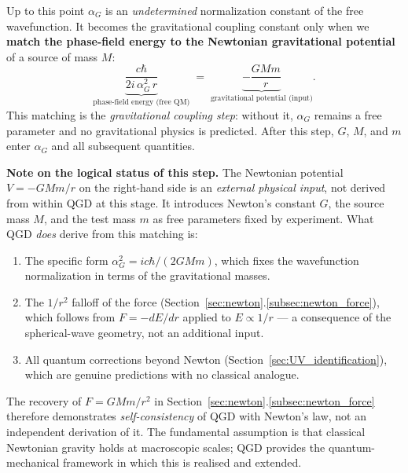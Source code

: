 \documentclass[11pt,a4paper]{article}
\theoremstyle{definition}
\theoremstyle{remark}
\begin{document}
	\begin{tcolorbox}[enhanced,breakable,
	  colback=white,colframe=black,
	  title={\textbf{Key step: this is where the free-Dirac theory couples to gravity}},
	  fonttitle=\bfseries]
	Up to this point $\alpha_G$ is an \emph{undetermined} normalization constant of the
	free wavefunction.  It becomes the gravitational coupling constant only when we
	\textbf{match the phase-field energy to the Newtonian gravitational potential} of a
	source of mass $M$:
	\begin{equation}
	  \underbrace{\frac{c\hbar}{2i\,\alpha_G^2\,r}}_{\text{phase-field energy (free QM)}}
	  \;=\;
	  \underbrace{-\frac{GMm}{r}}_{\text{gravitational potential (input)}}.
	  \label{eq:coupling_step}
	\end{equation}
	This matching is the \emph{gravitational coupling step}: without it, $\alpha_G$
	remains a free parameter and no gravitational physics is predicted.
	After this step, $G$, $M$, and $m$ enter $\alpha_G$ and all subsequent quantities.

	\medskip
	\noindent\textbf{Note on the logical status of this step.}
	The Newtonian potential $V = -GMm/r$ on the right-hand side is an \emph{external
	physical input}, not derived from within QGD at this stage.  It introduces Newton's
	constant $G$, the source mass $M$, and the test mass $m$ as free parameters fixed
	by experiment.  What QGD \emph{does} derive from this matching is:
	\begin{enumerate}
	  \item The specific form $\alpha_G^2 = ic\hbar/(2GMm)$, which fixes the wavefunction
	    normalization in terms of the gravitational masses.
	  \item The $1/r^2$ falloff of the force (Section~\ref{sec:newton}.\ref{subsec:newton_force}),
	    which follows from $F = -dE/dr$ applied to $E \propto 1/r$ --- a consequence of
	    the spherical-wave geometry, not an additional input.
	  \item All quantum corrections beyond Newton (Section~\ref{sec:UV_identification}),
	    which are genuine predictions with no classical analogue.
	\end{enumerate}
	The recovery of $F = GMm/r^2$ in Section~\ref{sec:newton}.\ref{subsec:newton_force}
	therefore demonstrates \emph{self-consistency} of QGD with Newton's law, not an
	independent derivation of it.  The fundamental assumption is that classical
	Newtonian gravity holds at macroscopic scales; QGD provides the quantum-mechanical
	framework in which this is realised and extended.
	\end{tcolorbox}
\end{document}
